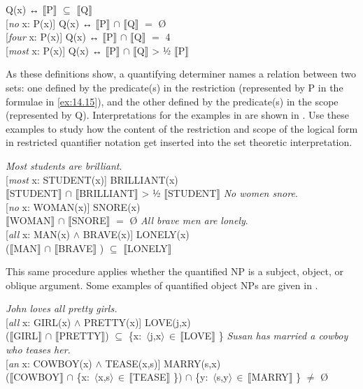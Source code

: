 \ea \label{ex:14.15}
\ea {} Q(x)  ↔   $\llbracket$P$\rrbracket$  ${\subseteq}$ $\llbracket$Q$\rrbracket$ \\
\ex{} [\textit{no} x: P(x)] Q(x)  ↔   $\llbracket$P$\rrbracket$  ${\cap}$ $\llbracket$Q$\rrbracket$  $=$ \O \\
\ex{} [\textit{four} x: P(x)] Q(x)  ↔   {\textbar} $\llbracket$P$\rrbracket$  ${\cap}$ $\llbracket$Q$\rrbracket$  {\textbar}  $=$ 4\\
\ex{} [\textit{most} x: P(x)] Q(x)  ↔   {\textbar} $\llbracket$P$\rrbracket$  ${\cap}$ $\llbracket$Q$\rrbracket$  {\textbar}  >  ½ {\textbar} $\llbracket$P$\rrbracket$ {\textbar}
                       \z
\z


As these definitions show, a quantifying determiner names a relation between two sets: one defined by the predicate(s) in the restriction (represented by P in the formulae in \ref{ex:14.15}), and the other defined by the predicate(s) in the scope (represented by Q). Interpretations for the examples in  are shown in . Use these examples to study how the content of the restriction and scope of the logical form in restricted quantifier notation get inserted into the set theoretic interpretation.


\ea \label{ex:14.16}
\ea  \textit{Most students are brilliant}.\\
{}[\textit{most} x: STUDENT(x)] BRILLIANT(x)\\
{\textbar} $\llbracket$STUDENT$\rrbracket$  ${\cap}$ $\llbracket$BRILLIANT$\rrbracket$  {\textbar}  >  ½ \textsc{{\textbar}} $\llbracket$STUDENT$\rrbracket$ {\textbar}
\ex \textit{No women snore}.\\
{}[\textit{no} x: WOMAN(x)] SNORE(x)\\
$\llbracket$WOMAN$\rrbracket$  ${\cap}$ $\llbracket$SNORE$\rrbracket$  $=$ \O
\ex   \textit{All brave men are lonely}.\\
{}[\textit{all} x: MAN(x) $\wedge$ BRAVE(x)] LONELY(x)\\
($\llbracket$MAN$\rrbracket$  ${\cap}$ $\llbracket$BRAVE$\rrbracket$ )  ${\subseteq}$ $\llbracket$LONELY$\rrbracket$ 
\z \z


This same procedure applies whether the quantified NP is a subject, object, or oblique argument. Some examples of quantified object NPs are given in .


\ea \label{ex:14.17}
\ea \textit{John loves all pretty girls.}\\
{}[\textit{all} x: GIRL(x) $\wedge$ PRETTY(x)] LOVE(j,x)\\
($\llbracket$GIRL$\rrbracket$  ${\cap}$ $\llbracket$PRETTY$\rrbracket$) ${\subseteq}$ \{x:~$\langle$j,x$\rangle \, {\in} \, \llbracket$LOVE$\rrbracket$ \}
\ex \textit{Susan has married a cowboy who teases her.}\\
{}[\textit{an} x: COWBOY(x) $\wedge$ TEASE(x,s)] MARRY(s,x)\\
($\llbracket$COWBOY$\rrbracket$  ${\cap}$ \{x:~$\langle$x,s$\rangle \, {\in} \, \llbracket$TEASE$\rrbracket$ \}) ${\cap}$ \{y:~$\langle$s,y$\rangle \, {\in} \, \llbracket$MARRY$\rrbracket$ \} $\neq$ \O 
\z \z



